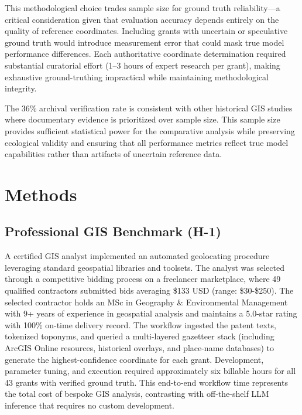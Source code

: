 This methodological choice trades sample size for ground truth
reliability---a critical consideration given that evaluation accuracy
depends entirely on the quality of reference coordinates. Including
grants with uncertain or speculative ground truth would introduce
measurement error that could mask true model performance differences.
Each authoritative coordinate determination required substantial
curatorial effort (1--3 hours of expert research per grant), making
exhaustive ground-truthing impractical while maintaining methodological
integrity.

The 36\% archival verification rate is consistent with other historical
GIS studies where documentary evidence is prioritized over sample size.
This sample size provides sufficient statistical power for the
comparative analysis while preserving ecological validity and ensuring
that all performance metrics reflect true model capabilities rather than
artifacts of uncertain reference data.

\section{Methods}\label{methods}

\subsection{Professional GIS Benchmark
(H-1)}\label{professional-gis-benchmark-h-1}

A certified GIS analyst \citep{Bashorun2025_gis} implemented an
automated geolocating procedure leveraging standard geospatial libraries
and toolsets. The analyst was selected through a competitive bidding
process on a freelancer marketplace, where 49 qualified contractors
submitted bids averaging \$133 USD (range: \$30-\$250). The selected
contractor holds an MSc in Geography \& Environmental Management with 9+
years of experience in geospatial analysis and maintains a 5.0-star
rating with 100\% on-time delivery record. The workflow ingested the
patent texts, tokenized toponyms, and queried a multi-layered gazetteer
stack (including ArcGIS Online resources, historical overlays, and
place-name databases) to generate the highest-confidence coordinate for
each grant. Development, parameter tuning, and execution required
approximately six billable hours for all 43 grants with verified ground
truth. This end-to-end workflow time represents the total cost of
bespoke GIS analysis, contrasting with off-the-shelf LLM inference that
requires no custom development.

